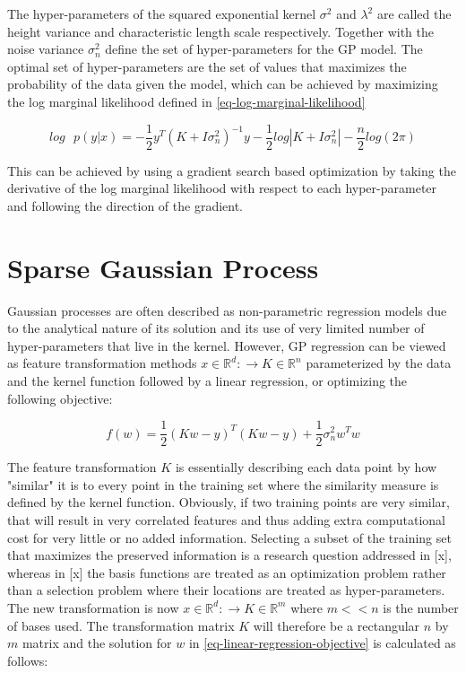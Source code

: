 \documentclass[a4paper,12pt]{article}
\begin{document}
The hyper-parameters of the squared exponential kernel $\sigma^{2}$ and $\lambda^{2}$ are called the height variance and characteristic length scale respectively. Together with the noise variance $\sigma_{n}^{2}$ define the set of hyper-parameters for the GP model. The optimal set of hyper-parameters are the set of values that maximizes the probability of the data given the model, which can be achieved by maximizing the log marginal likelihood defined in \eqref{eq-log-marginal-likelihood} 

\begin{equation}
\label{eq-log-marginal-likelihood}
log\text{ }p(y|x) = -\frac{1}{2}y^{T}\left(K+I\sigma_{n}^{2} \right)^{-1}y-\frac{1}{2}log\left | K+I\sigma_{n}^{2}\right|-\frac{n}{2}log(2\pi)
\end{equation}

This can be achieved by using a gradient search based optimization by taking the derivative of the log marginal likelihood with respect to each hyper-parameter and following the direction of the gradient.

\section{Sparse Gaussian Process}
\label{sec-sparse-gaussian-process}
Gaussian processes are often described as non-parametric regression models due to the analytical nature of its solution and its use of very limited number of hyper-parameters that live in the kernel. However, GP regression can be viewed as feature transformation methods $x\in \mathbb{R}^{d}:\rightarrow K\in \mathbb{R}^{n}$ parameterized by the data and the kernel function followed by a linear regression, or optimizing the following objective:

\begin{equation}
\label{eq-linear-regression-objective}
f(w)=\frac{1}{2}\left ( Kw-y \right )^{T} \left( Kw-y \right )+\frac{1}{2}\sigma_{n}^{2}w^{T}w
\end{equation}

The feature transformation $K$ is essentially describing each data point by how "similar" it is to every point in the training set where the similarity measure is defined by the kernel function. Obviously, if two training points are very similar, that will result in very correlated features and thus adding extra computational cost for very little or no added information. Selecting a subset of the training set that maximizes the preserved information is a research question addressed in [x], whereas in [x] the basis functions are treated as an optimization problem rather than a selection problem where their locations are treated as hyper-parameters. The new transformation is now $x\in \mathbb{R}^{d}:\rightarrow K\in \mathbb{R}^{m}$ where $m<<n$ is the number of bases used. The transformation matrix $K$ will therefore be a rectangular $n$ by $m$ matrix and the solution for $w$ in \eqref{eq-linear-regression-objective} is calculated as follows:
\end{document}
